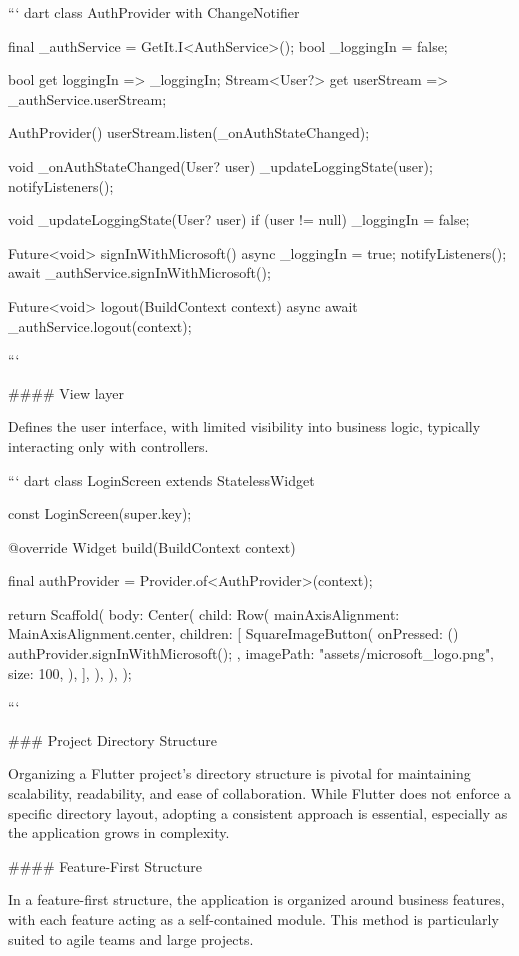 \documentclass[
  digital,     %
  oneside,     %
  nosansbold,  %
  nocolorbold, %
  lof,         %
  lot,         %
]{fithesis4}
\begin{document}
\begin{markdown}
``` dart
class AuthProvider with ChangeNotifier {
  final _authService = GetIt.I<AuthService>();
  bool _loggingIn = false;

  bool get loggingIn => _loggingIn;
  Stream<User?> get userStream => _authService.userStream;

  AuthProvider() {
    userStream.listen(_onAuthStateChanged);
  }

  void _onAuthStateChanged(User? user) {
    _updateLoggingState(user);
    notifyListeners();
  }

  void _updateLoggingState(User? user) {
    if (user != null) {
      _loggingIn = false;
    }
  }

  Future<void> signInWithMicrosoft() async {
    _loggingIn = true;
    notifyListeners();
    await _authService.signInWithMicrosoft();
  }

  Future<void> logout(BuildContext context) async {
    await _authService.logout(context);
  }
}
```

#### View layer

Defines the user interface, with limited visibility into business logic, typically interacting only with controllers.

``` dart
class LoginScreen extends StatelessWidget {
  const LoginScreen({super.key});

  @override
  Widget build(BuildContext context) {
    final authProvider = Provider.of<AuthProvider>(context);

    return Scaffold(
      body: Center(
        child: Row(
          mainAxisAlignment: MainAxisAlignment.center,
          children: [
            SquareImageButton(
              onPressed: () {
                authProvider.signInWithMicrosoft();
              },
              imagePath: "assets/microsoft_logo.png",
              size: 100,
            ),
          ],
        ),
      ),
    );
  }
}
```

### Project Directory Structure

Organizing a Flutter project's directory structure is pivotal for maintaining scalability, readability, and ease of collaboration. While Flutter does not enforce a specific directory layout, adopting a consistent approach is essential, especially as the application grows in complexity.

#### Feature-First Structure

In a feature-first structure, the application is organized around business features, with each feature acting as a self-contained module.  
This method is particularly suited to agile teams and large projects.

\end{markdown}
\end{document}
